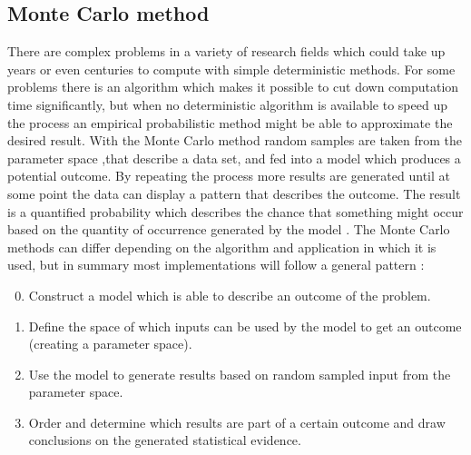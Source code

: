 \subsection{Monte Carlo method}
There are complex problems in a variety of research fields which could take up years or even centuries to compute with simple deterministic methods. For some problems there is an algorithm which makes it possible to cut down computation time significantly, but when no deterministic algorithm is available to speed up the process an empirical probabilistic method might be able to approximate the desired result. With the Monte Carlo method random samples are taken from the parameter space ,that describe a data set, and fed into a model which produces a potential outcome. By repeating the process more results are generated until at some point the data can display a pattern that describes the outcome. The result is a quantified probability which describes the chance that something might occur based on the quantity of occurrence generated by the model \cite{stephanie_monte_2015,wikipedia_monte_2019,wikipedia_monte-carlosimulatie_2018}.
\newline
The Monte Carlo methods can differ depending on the algorithm and application in which it is used, but in summary most implementations will follow a general pattern \cite{wikipedia_monte_2019}:
\begin{enumerate}
	\setcounter{enumi}{-1}
	\item Construct a model which is able to describe an outcome of the problem.
	\item Define the space of which inputs can be used by the model to get an outcome (creating a parameter space). 
	\item Use the model to generate results based on random sampled input from the parameter space.
	\item Order and determine which results are part of a certain outcome and draw conclusions on the generated statistical evidence.
\end{enumerate}

\label{subsec:Monte_Carlo_Method}


